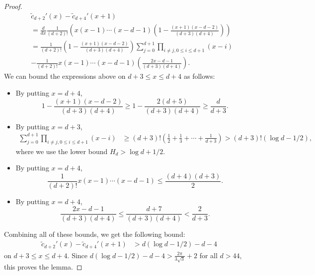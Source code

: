 \documentclass[10pt,a4paper]{amsart}
\begin{document}
\begin{proof}
    \begin{align*}
        &\tilde{c}_{d+2}'(x) - \tilde{c}_{d+4}'(x+1) \\
        &= \frac{d}{dx}\frac{1}{(d+2)!}\left( x(x-1)\cdots (x-d-1) \left(1-\frac{(x+1)(x-d-2)}{(d+3)(d+4)}\right) \right) \\
        &= \frac{1}{(d+2)!}\left(1-\frac{(x+1)(x-d-2)}{(d+3)(d+4)}\right)
        \sum_{j=0}^{d+1}\prod_{i\neq j,0\leq i\leq d+1}^{}(x-i) \\
        &-\frac{1}{(d+2)!}x(x-1)\cdots (x-d-1)\left(\frac{2x-d-1}{(d+3)(d+4)}\right).
    \end{align*}
    We can bound the expressions above on $d+3\leq x\leq d+4$ as follows:
    \begin{itemize}
        \item By putting $x=d+4$,
        $$ 1-\frac{(x+1)(x-d-2)}{(d+3)(d+4)} \geq 1 - \frac{2(d+5)}{(d+3)(d+4)}
        \geq\frac{d}{d+3}. $$
        \item By putting $x=d+3$,
        \begin{align*}
            \sum_{j=0}^{d+1}\prod_{i\neq j,0\leq i\leq d+1}^{}(x-i) 
            &\geq (d+3)!\left(\frac{1}{2}+\frac{1}{3}+\cdots + \frac{1}{d+3}\right)
            > (d+3)! \left(\log d -1/2 \right),
        \end{align*}
        where we use the lower bound $H_d > \log d + 1/2$.
        \item By putting $x=d+4$,
        $$ \frac{1}{(d+2)!}x(x-1)\cdots (x-d-1) 
        \leq \frac{(d+4)(d+3)}{2}. $$
        \item By putting $x=d+4$,
        $$ \frac{2x-d-1}{(d+3)(d+4)} \leq \frac{d+7}{(d+3)(d+4)} < \frac{2}{d+3}. $$
        
    \end{itemize}
    Combining all of these bounds, we get the following bound:
    \begin{align*}
        \tilde{c}_{d+2}'(x) - \tilde{c}_{d+4}'(x+1) 
        &> d\left(\log d-1/2\right) - d-4
    \end{align*}
    on $d+3\leq x\leq d+4$. Since $d\left(\log d-1/2\right) - d-4 > \frac{2\pi}{3\sqrt{3}}+2$ for all $d> 44$, this proves the lemma.
 \end{proof}
\end{document}
